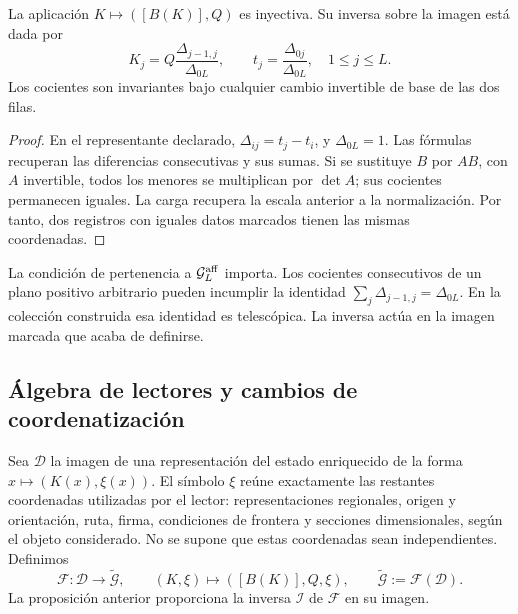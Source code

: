 \begin{proposition}
\label{prop:compat-inversa-marcada}
La aplicación \(K\mapsto([B(K)],Q)\) es inyectiva. Su inversa
sobre la imagen está dada por
\begin{equation}
 K_j=Q\frac{\Delta_{j-1,j}}{\Delta_{0L}},
 \qquad
 t_j=\frac{\Delta_{0j}}{\Delta_{0L}},
 \quad 1\leq j\leq L.
 \label{eq:compat-inversa-plucker}
\end{equation}
Los cocientes son invariantes bajo cualquier cambio invertible de base
de las dos filas.
\end{proposition}
\begin{proof}
En el representante declarado,
\(\Delta_{ij}=t_j-t_i\), y \(\Delta_{0L}=1\).
Las fórmulas recuperan las diferencias consecutivas y sus sumas.
Si se sustituye \(B\) por \(AB\), con \(A\) invertible,
todos los menores se multiplican por \(\det A\); sus cocientes
permanecen iguales. La carga recupera la escala anterior a la
normalización. Por tanto, dos registros con iguales datos marcados
tienen las mismas coordenadas.
\end{proof}

La condición de pertenencia a \(\mathcal G_L^{\rm aff}\) importa.
Los cocientes consecutivos de un plano positivo arbitrario pueden
incumplir la identidad \(\sum_j\Delta_{j-1,j}=\Delta_{0L}\).
En la colección construida esa identidad es telescópica. La inversa actúa
en la imagen marcada que acaba de definirse.

\subsection{Álgebra de lectores y cambios de coordenatización}

Sea \(\mathcal D\) la imagen de una representación del estado enriquecido
de la forma \(x\mapsto(K(x),\xi(x))\). El símbolo \(\xi\)
reúne exactamente las restantes coordenadas utilizadas por el lector:
representaciones regionales, origen y orientación, ruta, firma, condiciones
de frontera y secciones dimensionales, según el objeto considerado.
No se supone que estas coordenadas sean independientes. Definimos
\[
 \mathcal F:\mathcal D\longrightarrow\widetilde{\mathcal G},
 \qquad (K,\xi)\longmapsto([B(K)],Q,\xi),
 \qquad \widetilde{\mathcal G}:=\mathcal F(\mathcal D).
\]
La proposición anterior proporciona la inversa \(\mathcal I\) de
\(\mathcal F\) en su imagen.

